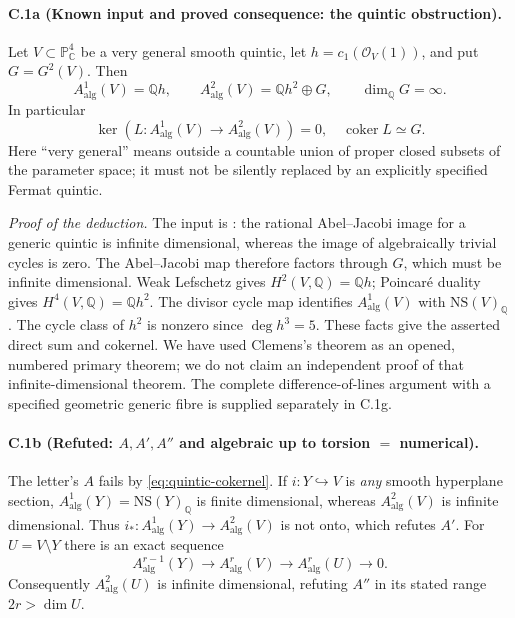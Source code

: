 \paragraph{C.1a (Known input and proved consequence: the quintic obstruction).}
Let $V\subset\mathbb P^4_{\mathbb C}$ be a very general smooth quintic,
let $h=c_1(\mathcal O_V(1))$, and put $G=G^2(V)$. Then
\begin{equation}\label{eq:quintic-decomposition}
 A^1_{\mathrm{alg}}(V)=\mathbb Qh,
 \qquad A^2_{\mathrm{alg}}(V)=\mathbb Qh^2\oplus G,
 \qquad \dim_{\mathbb Q}G=\infty.
\end{equation}
In particular
\begin{equation}\label{eq:quintic-cokernel}
 \ker(L:A^1_{\mathrm{alg}}(V)\to A^2_{\mathrm{alg}}(V))=0,
 \quad
 \operatorname{coker}L\simeq G.
\end{equation}
Here ``very general'' means outside a countable union of proper closed
subsets of the parameter space; it must not be silently replaced by an
explicitly specified Fermat quintic.

\emph{Proof of the deduction.}
The input is \citet[Theorem (0.2), equation (0.1)]{cyClemens1983}:
the rational Abel--Jacobi image for a generic quintic is infinite
dimensional, whereas the image of algebraically trivial cycles is zero.
The Abel--Jacobi map therefore factors through $G$, which must be infinite
dimensional. Weak Lefschetz gives $H^2(V,\mathbb Q)=\mathbb Qh$;
Poincar\'e duality gives $H^4(V,\mathbb Q)=\mathbb Qh^2$.
The divisor cycle map identifies $A^1_{\mathrm{alg}}(V)$ with
$\mathrm{NS}(V)_{\mathbb Q}$. The cycle class of $h^2$ is nonzero since
$\deg h^3=5$. These facts give the asserted direct sum and cokernel.
We have used Clemens's theorem as an opened, numbered primary theorem;
we do not claim an independent proof of that infinite-dimensional theorem.
The complete difference-of-lines argument with a specified geometric
generic fibre is supplied separately in C.1g.

\paragraph{C.1b (Refuted: $A,A',A''$ and algebraic up to torsion $=$ numerical).}
The letter's $A$ fails by \eqref{eq:quintic-cokernel}. If
$i:Y\hookrightarrow V$ is \emph{any} smooth hyperplane section,
$A^1_{\mathrm{alg}}(Y)=\mathrm{NS}(Y)_{\mathbb Q}$ is finite dimensional,
whereas $A^2_{\mathrm{alg}}(V)$ is infinite dimensional. Thus
$i_*:A^1_{\mathrm{alg}}(Y)\to A^2_{\mathrm{alg}}(V)$ is not onto,
which refutes $A'$. For $U=V\setminus Y$ there is an exact sequence
\begin{equation}\label{eq:alg-localization}
 A^{r-1}_{\mathrm{alg}}(Y)\longrightarrow
 A^r_{\mathrm{alg}}(V)\longrightarrow
 A^r_{\mathrm{alg}}(U)\longrightarrow0.
\end{equation}
Consequently $A^2_{\mathrm{alg}}(U)$ is infinite dimensional, refuting
$A''$ in its stated range $2r>\dim U$.

